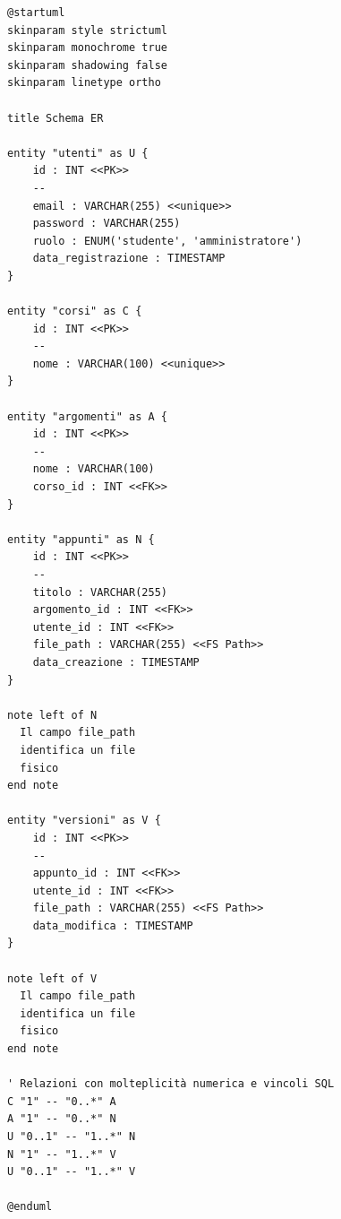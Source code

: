 \begin{verbatim}
@startuml
skinparam style strictuml
skinparam monochrome true
skinparam shadowing false
skinparam linetype ortho

title Schema ER

entity "utenti" as U {
    id : INT <<PK>>
    --
    email : VARCHAR(255) <<unique>>
    password : VARCHAR(255)
    ruolo : ENUM('studente', 'amministratore')
    data_registrazione : TIMESTAMP
}

entity "corsi" as C {
    id : INT <<PK>>
    --
    nome : VARCHAR(100) <<unique>>
}

entity "argomenti" as A {
    id : INT <<PK>>
    --
    nome : VARCHAR(100)
    corso_id : INT <<FK>>
}

entity "appunti" as N {
    id : INT <<PK>>
    --
    titolo : VARCHAR(255)
    argomento_id : INT <<FK>>
    utente_id : INT <<FK>>
    file_path : VARCHAR(255) <<FS Path>>
    data_creazione : TIMESTAMP
}

note left of N
  Il campo file_path
  identifica un file 
  fisico
end note

entity "versioni" as V {
    id : INT <<PK>>
    --
    appunto_id : INT <<FK>>
    utente_id : INT <<FK>>
    file_path : VARCHAR(255) <<FS Path>>
    data_modifica : TIMESTAMP
}

note left of V
  Il campo file_path
  identifica un file 
  fisico
end note

' Relazioni con molteplicità numerica e vincoli SQL
C "1" -- "0..*" A
A "1" -- "0..*" N
U "0..1" -- "1..*" N
N "1" -- "1..*" V
U "0..1" -- "1..*" V

@enduml
\end{verbatim}